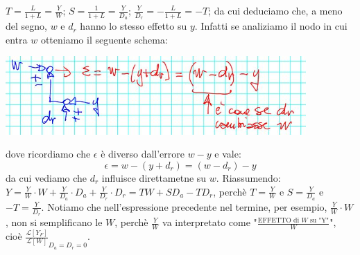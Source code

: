 $T = \frac{L}{1+L} = \frac{Y}{W}$;\newline
$S = \frac{1}{1+L} = \frac{Y}{D_a}$;\newline
$\frac{Y}{D_r} = - \frac{L}{1+L} = -T$;\newline
da cui deduciamo che, a meno del segno, $w$ e $d_r$ hanno lo stesso effetto su $y$.\newline
Infatti se analiziamo il nodo in cui entra $w$ otteniamo il seguente schema:
\begin{center}
    \includegraphics[height=3cm]{../lezione18/img3.JPG}
\end{center}
dove ricordiamo che $\epsilon$ è diverso dall'errore $w-y$ e vale:
\[
    \epsilon = w - (y+d_r) = (w-d_r) - y
\]
da cui vediamo che $d_r$ influisce direttametne su $w$.\newline
\newline
Riassumendo:\newline
$Y= \frac{Y}{W} \cdot  W + \frac{Y}{D_a} \cdot  D_a + \frac{Y}{D_r} \cdot D_r = TW + SD_a - TD_r$, perchè $T = \frac{Y}{W}$ e $S= \frac{Y}{D_a}$ e $-T = \frac{Y}{D_r}$.\newline
Notiamo che nell'espressione precedente nel termine, per esempio, $\frac{Y}{W} \cdot  W$, non si semplificano le $W$, perchè $\frac{Y}{W}$ va interpretato come "$\frac{\text{EFFETTO di $W$ su "Y"}}{W}$", cioè $\frac{\mathcal{L}[Y_F]}{\mathcal{L}[W]}_{D_a = D_r = 0}$.
